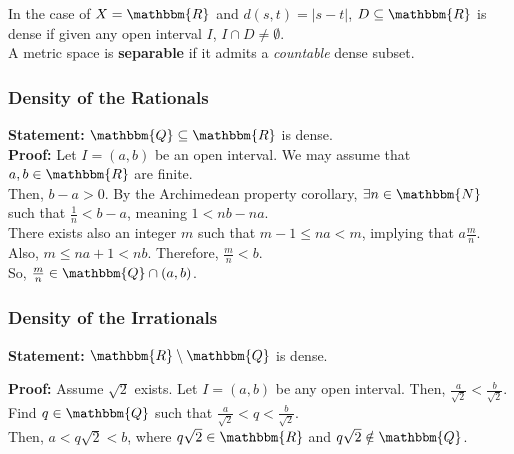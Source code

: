 \documentclass[10pt]{extarticle}
\newcommand{\N}{\mathbbm{N}}
\newcommand{\Q}{\mathbbm{Q}}
\newcommand{\R}{\mathbbm{R}}
\begin{document}
    In the case of $X = \R$ and $d(s,t) = |s-t|$, $D\subseteq \R$ is dense if given any open interval $I$, $I\cap D \neq \emptyset$.\\

    A metric space is \textbf{separable} if it admits a \textsl{countable} dense subset.
    \subsubsection{Density of the Rationals}%
    \textbf{Statement:} $\Q\subseteq\R$ is dense.\\

    \textbf{Proof:} Let $I = (a,b)$ be an open interval. We may assume that $a,b\in\R$ are finite.\\

      Then, $b-a > 0$. By the Archimedean property corollary, $\exists n\in\N$ such that $\frac{1}{n} < b-a$, meaning $1 < nb-na$.\\

      There exists also an integer $m$ such that $m-1 \leq na < m$, implying that $a \frac{m}{n}$. Also, $m \leq na+1 < nb$. Therefore, $\frac{m}{n} < b$.\\

      So, $\frac{m}{n}\in \Q\cap (a,b)$.
    \subsubsection{Density of the Irrationals}%
    \textbf{Statement:} $\R\setminus\Q$ is dense.

    \textbf{Proof:} Assume $\sqrt{2}$ exists. Let $I = (a,b)$ be any open interval. Then, $\frac{a}{\sqrt{2}} < \frac{b}{\sqrt{2}}$.\\

      Find $q\in\Q$ such that $\frac{a}{\sqrt{2}} < q < \frac{b}{\sqrt{2}}$.\\

      Then, $a < q\sqrt{2} < b$, where $q\sqrt{2} \in\R$ and $q\sqrt{2}\notin\Q$.
\end{document}
